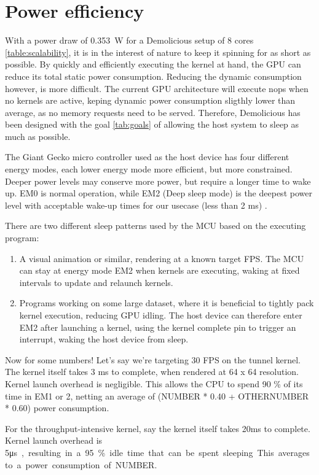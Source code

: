 \documentclass[../main/report.tex]{subfiles}
\begin{document}
\section{Power efficiency}

With a power draw of \SI{0.353}{W} for a Demolicious setup of 8 cores \ref{table:scalability},
it is in the interest of nature to keep it spinning for as short as possible.
By quickly and efficiently executing the kernel at hand, the GPU can reduce its total static power consumption.
Reducing the dynamic consumption however, is more difficult.
The current GPU architecture will execute nops when no kernels are active, keping dynamic power consumption sligthly lower than average, as no memory requests need to be served.
Therefore, Demolicious has been designed with the goal \ref{tab:goals} of allowing the host system to sleep as much as possible.

The Giant Gecko micro controller used as the host device has four different energy modes, each lower energy mode more efficient, but more constrained.
Deeper power levels may conserve more power, but require a longer time to wake up.
EM0 is normal operation, while EM2 (Deep sleep mode) is the deepest power level with acceptable wake-up times for our usecase (less than 2 ms) \cite{efm-referencemanual}.

There are two different sleep patterns used by the MCU based on the executing program:
\begin{enumerate}
  \item
    A visual animation or similar, rendering at a known target FPS.
    The MCU can stay at energy mode EM2 when kernels are executing, waking at fixed intervals to update and relaunch kernels.
  \item
    Programs working on some large dataset, where it is beneficial to tightly pack kernel execution, reducing GPU idling.
    The host device can therefore enter EM2 after launching a kernel, using the kernel complete pin to trigger an interrupt, waking the host device from sleep.
\end{enumerate}


Now for some numbers!
Let's say we're targeting 30 FPS on the tunnel kernel.
The kernel itself takes 3 ms to complete, when rendered at 64 x 64 resolution.
Kernel launch overhead is negligible.
This allows the CPU to spend 90 \% of its time in EM1 or 2, netting an average of (NUMBER * 0.40 + OTHERNUMBER * 0.60) power consumption.

For the throughput-intensive kernel, say the kernel itself takes 20ms to complete.
Kernel launch overhead is 5\si\micro s, resulting in a 95 \% idle time that can be spent sleeping.
This averages to a power consumption of NUMBER.
\end{document}
